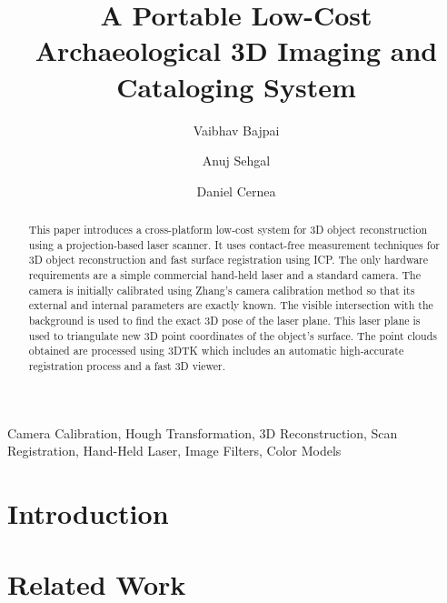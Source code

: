 \documentclass[english]{llncs}
\newenvironment{keywords}{
       \list{}{\advance\topsep by0.35cm\relax\small
       \leftmargin=1cm
       \labelwidth=0.35cm
       \listparindent=0.35cm
       \itemindent\listparindent
       \rightmargin\leftmargin}
			 \item[\hskip\labelsep\bfseries Keywords:]}
     {\endlist}
\begin{document}
\frontmatter 
	\pagestyle{headings} 
\mainmatter 

\title{A Portable Low-Cost Archaeological 3D Imaging and Cataloging System}

\author{Vaibhav Bajpai\and Anuj Sehgal\and Daniel Cernea}



\maketitle

\begin{abstract}
This paper introduces a cross-platform low-cost system for 3D object reconstruction using a projection-based laser scanner. It uses contact-free measurement techniques for 3D object reconstruction and fast surface registration using \ac{ICP}. The only hardware requirements are a simple commercial hand-held laser and a standard camera. The camera is initially calibrated using Zhang's camera calibration method so that its external and internal parameters are exactly known. The visible intersection with the background is used to find the exact 3D pose of the laser plane. This laser plane is used to triangulate new 3D point coordinates of the object's surface. The point clouds obtained are processed using \ac{3DTK} which includes an automatic high-accurate registration process and a fast 3D viewer.
\end{abstract}

\begin{keywords}
	Camera Calibration, Hough Transformation, 
	3D Reconstruction, Scan Registration, 
	Hand-Held Laser, Image Filters, Color Models
\end{keywords}

\section{Introduction}
\label{section:introduction}


\section{Related Work}
\label{section:relatedwork}

\end{document}
